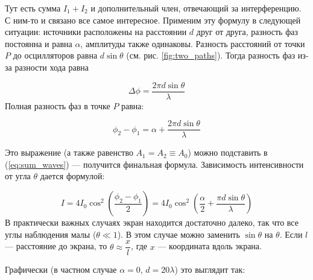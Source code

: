 \documentclass[11pt,a4paper]{article}
\numberwithin{equation}{section}
\begin{document}
Тут есть сумма $I_1 + I_2$ и дополнительный член, отвечающий за
интерференцию. С ним-то и связано все самое интересное. Применим эту
формулу в следующей ситуации: источники расположены на расстоянии $d$
друг от друга, разность фаз постоянна и равна $\alpha$, амплитуды
также одинаковы. Разность расстояний от точки $P$ до осцилляторов
равна $d\sin \theta$ (см. рис. \ref{fig:two_paths}). Тогда разность фаз
из-за разности хода равна

\begin{equation}
\Delta \phi = \frac{2\pi d \sin \theta}{\lambda}
\end{equation}
Полная разность фаз в точке $P$ равна:

\begin{equation}
\phi_2 - \phi_1 = \alpha + \frac{2\pi d \sin \theta}{\lambda}
\end{equation}

Это выражение (а также равенство $A_1 = A_2 \equiv A_0$) можно подставить в (\ref{eq:sum_waves}) --- получится финальная формула. Зависимость интенсивности от угла $\theta$ дается формулой:

\begin{equation}
I = 4I_0 \cos^2 \left( \frac{\phi_2 - \phi_1}{2} \right) = 4I_0 \cos^2 \left( \frac{\alpha}{2} + \frac{\pi d \sin \theta}{\lambda} \right) 
\end{equation}
В практически важных случаях экран находится достаточно далеко, так что все углы наблюдения малы ($\theta \ll 1$). В этом случае можно заменить $\sin \theta$ на $\theta$. Если $l$ --- расстояние до экрана, то $\theta \approx \dfrac{x}{l}$, где $x$ --- координата вдоль экрана.

Графически (в частном случае $\alpha = 0$, $d = 20 \lambda $) это выглядит так: 

\begin{center}
\end{center}
\end{document}
